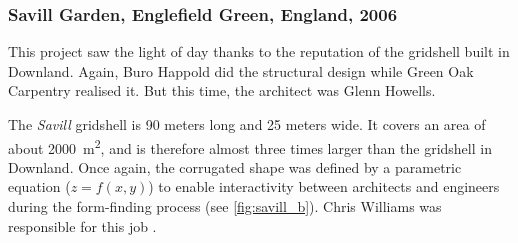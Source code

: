 


\subsubsection{Savill Garden, Englefield Green, England, 2006}

This project saw the light of day thanks to the reputation of the gridshell built in Downland. Again, Buro Happold did the structural design while Green Oak Carpentry realised it. But this time, the architect was Glenn Howells.

The \emph{Savill} gridshell is 90 meters long and 25 meters wide. It covers an area of about \SI{2000}{m^2}, and is therefore almost three times larger than the gridshell in Downland. Once again, the corrugated shape was defined by a parametric equation ($z = f(x,y)$) to enable interactivity between architects and engineers during the form-finding process (see \cref{fig:savill_b}). Chris Williams was responsible for this job \cite{Harris2008}.

